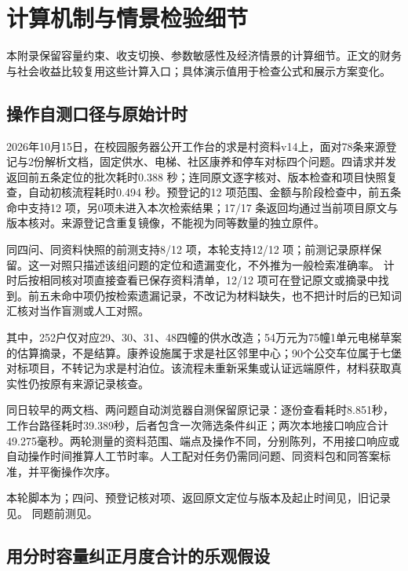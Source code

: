 \section{计算机制与情景检验细节}\label{app:science}
本附录保留容量约束、收支切换、参数敏感性及经济情景的计算细节。正文的财务与社会收益比较复用这些计算入口；具体演示值用于检查公式和展示方案变化。
\subsection{操作自测口径与原始计时}

2026年10月15日，在校园服务器公开工作台的求是村资料v14上，面对78条来源登记与2份解析文档，固定供水、电梯、社区康养和停车对标四个问题。四请求并发返回前五条定位的批次耗时0.388 秒；连同原文逐字核对、版本检查和项目快照复查，自动初核流程耗时0.494 秒。预登记的12 项范围、金额与阶段检查中，前五条命中支持12 项，另0项未进入本次检索结果；17/17 条返回均通过当前项目原文与版本核对。来源登记含重复镜像，不能视为同等数量的独立原件。

同四问、同资料快照的前测支持8/12 项，本轮支持12/12 项；前测记录原样保留。这一对照只描述该组问题的定位和遗漏变化，不外推为一般检索准确率。
计时后按相同核对项直接查看已保存资料清单，12/12 项可在登记原文或摘录中找到。前五未命中项仍按检索遗漏记录，不改记为材料缺失，也不把计时后的已知词汇核对当作盲测或人工对照。

其中，252户仅对应29、30、31、48四幢的供水改造；54万元为75幢1单元电梯草案的估算摘录，不是结算。康养设施属于求是社区邻里中心；90个公交车位属于七堡对标项目，不转记为求是村泊位。该流程未重新采集或认证远端原件，材料获取真实性仍按原有来源记录核查。

同日较早的两文档、两问题自动浏览器自测保留原记录：逐份查看耗时8.851秒，工作台路径耗时39.389秒，后者包含一次筛选条件纠正；两次本地接口响应合计49.275毫秒。两轮测量的资料范围、端点及操作不同，分别陈列，不用接口响应或自动操作时间推算人工节时率。人工配对任务仍需同问题、同资料包和同答案标准，并平衡操作次序。

本轮脚本为；四问、预登记核对项、返回原文定位与版本及起止时间见，旧记录见。 同题前测见。

\subsection{用分时容量纠正月度合计的乐观假设}

